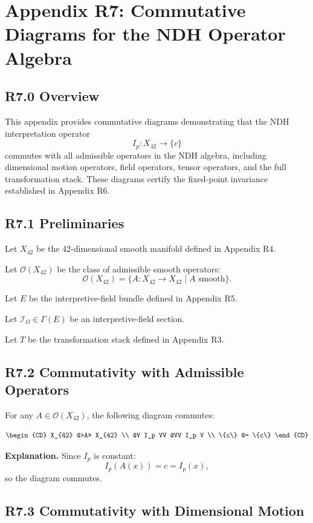 \appendix
\section*{Appendix R7: Commutative Diagrams for the NDH Operator Algebra}

\subsection*{R7.0 Overview}

This appendix provides commutative diagrams demonstrating that the NDH
interpretation operator
\[
I_p : X_{42} \to \{c\}
\]
commutes with all admissible operators in the NDH algebra, including
dimensional motion operators, field operators, tensor operators, and the
full transformation stack. These diagrams certify the fixed-point
invariance established in Appendix R6.

\subsection*{R7.1 Preliminaries}

Let $X_{42}$ be the 42-dimensional smooth manifold defined in Appendix
R4.

Let $\mathcal{O}(X_{42})$ be the class of admissible smooth operators:
\[
\mathcal{O}(X_{42}) = \{ A : X_{42} \to X_{42} \mid A \text{ smooth} \}.
\]

Let $E$ be the interpretive-field bundle defined in Appendix R5.

Let $\mathcal{I}_{\Omega} \in \Gamma(E)$ be an interpretive-field
section.

Let $T$ be the transformation stack defined in Appendix R3.

\subsection*{R7.2 Commutativity with Admissible Operators}

For any $A \in \mathcal{O}(X_{42})$, the following diagram commutes:

\[
\begin{CD}
X_{42} @>A>> X_{42} \\
@V I_p VV @VV I_p V \\
\{c\} @= \{c\}
\end{CD}
\]

\textbf{Explanation.}  
Since $I_p$ is constant:
\[
I_p(A(x)) = c = I_p(x),
\]
so the diagram commutes.

\subsection*{R7.3 Commutativity with Dimensional Motion}

